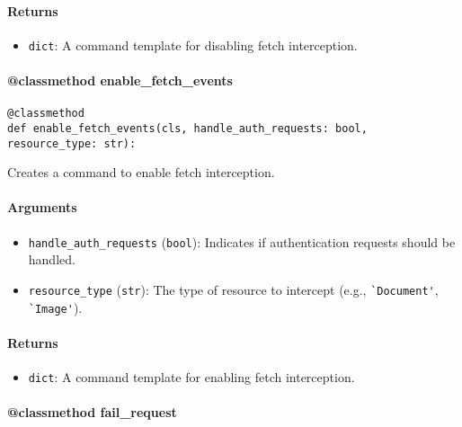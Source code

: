 \documentclass{article}
\begin{document}
\paragraph{Returns}

\begin{itemize}
    \item \lstinline[style=pythonstyle]|dict|: A command template for disabling fetch interception.
\end{itemize}

\paragraph{@classmethod enable\_fetch\_events}

\begin{lstlisting}[style=pythonstyle]
@classmethod
def enable_fetch_events(cls, handle_auth_requests: bool, resource_type: str):
\end{lstlisting}

\noindent Creates a command to enable fetch interception.

\paragraph{Arguments}

\begin{itemize}
    \item \lstinline[style=pythonstyle]|handle_auth_requests| (\lstinline[style=pythonstyle]|bool|): Indicates if authentication requests should be handled.
    \item \lstinline[style=pythonstyle]|resource_type| (\lstinline[style=pythonstyle]|str|): The type of resource to intercept (e.g., \lstinline[style=pythonstyle]|`Document'|, \lstinline[style=pythonstyle]|`Image'|).
\end{itemize}

\paragraph{Returns}

\begin{itemize}
    \item \lstinline[style=pythonstyle]|dict|: A command template for enabling fetch interception.
\end{itemize}

\paragraph{@classmethod fail\_request}
\end{document}
